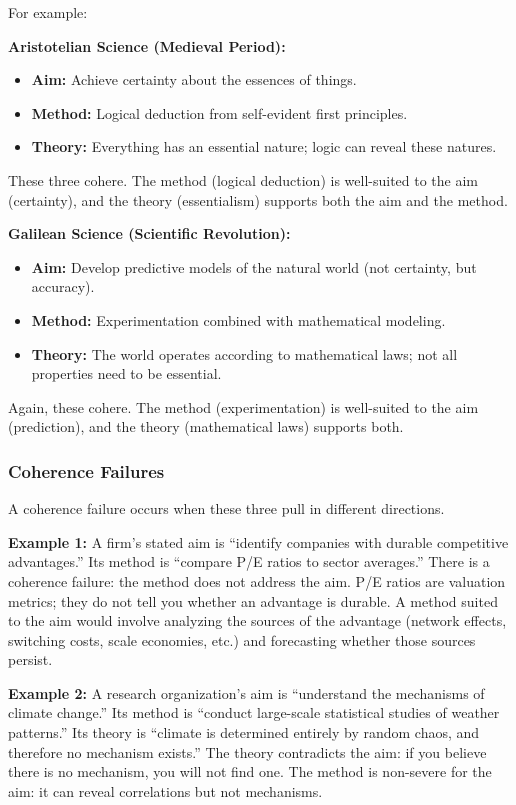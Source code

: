 \documentclass[11pt,letterpaper]{article}
\begin{document}
For example:

\textbf{Aristotelian Science (Medieval Period):}
\begin{itemize}
  \item \textbf{Aim:} Achieve certainty about the essences of things.
  \item \textbf{Method:} Logical deduction from self-evident first principles.
  \item \textbf{Theory:} Everything has an essential nature; logic can reveal these natures.
\end{itemize}

These three cohere. The method (logical deduction) is well-suited to the aim (certainty), and the theory (essentialism) supports both the aim and the method.

\textbf{Galilean Science (Scientific Revolution):}
\begin{itemize}
  \item \textbf{Aim:} Develop predictive models of the natural world (not certainty, but accuracy).
  \item \textbf{Method:} Experimentation combined with mathematical modeling.
  \item \textbf{Theory:} The world operates according to mathematical laws; not all properties need to be essential.
\end{itemize}

Again, these cohere. The method (experimentation) is well-suited to the aim (prediction), and the theory (mathematical laws) supports both.

\subsubsection*{Coherence Failures}

A coherence failure occurs when these three pull in different directions.

\textbf{Example 1:} A firm's stated aim is ``identify companies with durable competitive advantages.'' Its method is ``compare P/E ratios to sector averages.'' There is a coherence failure: the method does not address the aim. P/E ratios are valuation metrics; they do not tell you whether an advantage is durable. A method suited to the aim would involve analyzing the sources of the advantage (network effects, switching costs, scale economies, etc.) and forecasting whether those sources persist.

\textbf{Example 2:} A research organization's aim is ``understand the mechanisms of climate change.'' Its method is ``conduct large-scale statistical studies of weather patterns.'' Its theory is ``climate is determined entirely by random chaos, and therefore no mechanism exists.'' The theory contradicts the aim: if you believe there is no mechanism, you will not find one. The method is non-severe for the aim: it can reveal correlations but not mechanisms.
\end{document}
